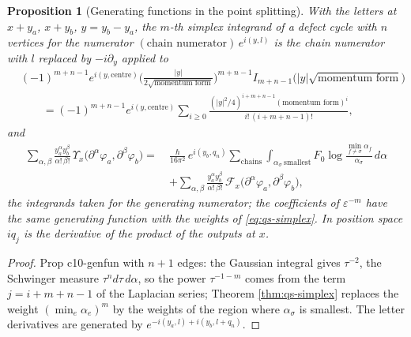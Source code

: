 \documentclass[11pt]{article}
\numberwithin{equation}{section}
\theoremstyle{plain}
\newtheorem{proposition}[theorem]{Proposition}
\theoremstyle{definition}
\begin{document}
\begin{proposition}[Generating functions in the point splitting]
\label{prop:qs-genfun}
With the letters at $x+y_a$, $x+y_b$, $y=y_b-y_a$, the $m$-th simplex integrand of a defect cycle with $n$ vertices for the numerator $(\text{chain numerator})\,e^{i(y,l)}$ is the chain numerator with $l$ replaced by $-i\partial_y$ applied to
\[
\begin{aligned}
&(-1)^{m+n-1}e^{i(y,\text{centre})}\Big(\frac{|y|}{2\sqrt{\text{momentum form}}}\Big)^{m+n-1}I_{m+n-1}\big(|y|\sqrt{\text{momentum form}}\big)\\
&\qquad=(-1)^{m+n-1}e^{i(y,\text{centre})}\sum_{i\ge0}\frac{(|y|^2/4)^{i+m+n-1}(\text{momentum form})^i}{i!\,(i+m+n-1)!},
\end{aligned}
\]
and
\[
\begin{aligned}
\sum_{\alpha,\beta}\frac{y_a^\alpha y_b^\beta}{\alpha!\,\beta!}\,\Upsilon_x\big(\partial^\alpha\varphi_a,\partial^\beta\varphi_b\big)=\ &\frac{\hbar}{16\pi^2}\,e^{i(y_b,q_n)}\sum_{\text{chains}}\int_{\alpha_\sigma\ \text{smallest}}F_0\log\frac{\min_{f\ne\sigma}\alpha_f}{\alpha_\sigma}\,d\alpha\\
&+\sum_{\alpha,\beta}\frac{y_a^\alpha y_b^\beta}{\alpha!\,\beta!}\,\mathcal F_x\big(\partial^\alpha\varphi_a,\partial^\beta\varphi_b\big),
\end{aligned}
\]
the integrands taken for the generating numerator; the coefficients of $\varepsilon^{-m}$ have the same generating function with the weights of \eqref{eq:qs-simplex}. In position space $iq_j$ is the derivative of the product of the outputs at $x$.
\end{proposition}

\begin{proof}
Prop c10-genfun with $n+1$ edges: the Gaussian integral gives $\tau^{-2}$, the Schwinger measure $\tau^nd\tau\,d\alpha$, so the power $\tau^{-1-m}$ comes from the term $j=i+m+n-1$ of the Laplacian series; Theorem \ref{thm:qs-simplex} replaces the weight $(\min_e\alpha_e)^m$ by the weights of the region where $\alpha_\sigma$ is smallest. The letter derivatives are generated by $e^{-i(y_a,l)+i(y_b,l+q_n)}$.
\end{proof}
\end{document}
